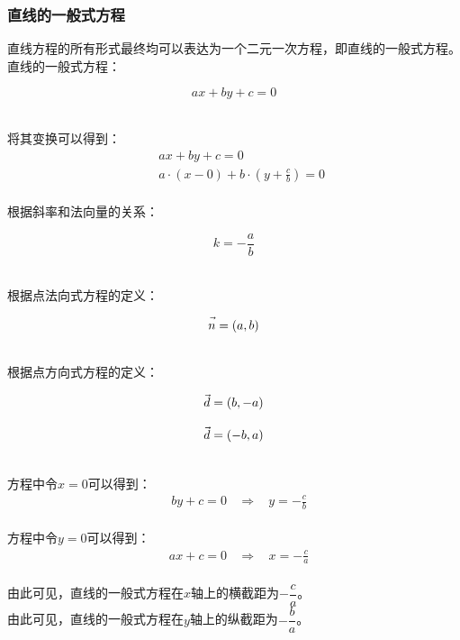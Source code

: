 \documentclass[UTF8]{ctexart}
\let\nvec\vec
\def\vec#1{\nvec{\vphantom b\smash{#1}}}
\begin{document}
\newpage

\subsubsection{直线的一般式方程}
    \setcounter{equation}{0}
    直线方程的所有形式最终均可以表达为一个二元一次方程，即直线的一般式方程。\\[3mm]
    直线的一般式方程：
    \begin{large}
        \begin{equation*}
            ax+by+c=0
        \end{equation*}
    \end{large}\\
    将其变换可以得到：
    \begin{align}
        &~~ax+by+c=0\\[3mm]
        &~~a\cdot(x-0)+b\cdot(y+\frac{c}{b})=0
    \end{align}\\
    根据斜率和法向量的关系：
    \begin{large}
        \begin{equation*}
            k=-\frac{a}{b}
        \end{equation*}
    \end{large}\\
    根据点法向式方程的定义：
    \begin{large}
        \begin{equation*}
            \vec{n}=(a,b)
        \end{equation*}
    \end{large}\\
    根据点方向式方程的定义：
    \begin{large}
        \begin{align*}
            \vec{d}=(b,-a)\\[3mm]
            \vec{d}=(-b,a)
        \end{align*}
    \end{large}\\
    方程中令$x=0$可以得到：
    \begin{align}
        &by+c=0~~~~\Longrightarrow~~~~y=-\frac{c}{b}
    \end{align}\\
    方程中令$y=0$可以得到：
    \begin{align}
        &ax+c=0~~~~\Longrightarrow~~~~x=-\frac{c}{a}
    \end{align}\\
    由此可见，直线的一般式方程在$x$轴上的横截距为$-\dfrac{c}{a}$。\\[6mm]
    由此可见，直线的一般式方程在$y$轴上的纵截距为$-\dfrac{b}{a}$。
\end{document}
